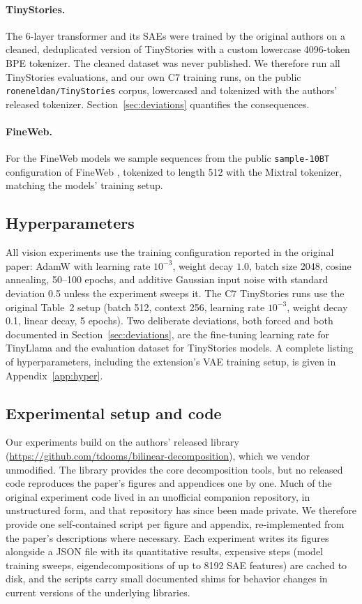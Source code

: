 \documentclass[10pt]{article} %
\begin{document}
\paragraph{TinyStories.} The 6-layer transformer and its SAEs were trained by the
original authors on a cleaned, deduplicated version of TinyStories
\citep{eldan2023tinystories} with a custom lowercase 4096-token BPE tokenizer.
The cleaned dataset was never published. We therefore run all
TinyStories evaluations, and our own C7 training runs, on the public
\texttt{roneneldan/TinyStories} corpus, lowercased and tokenized with the authors'
released tokenizer. Section~\ref{sec:deviations} quantifies the consequences.

\paragraph{FineWeb.} For the FineWeb models we sample sequences from the public
\texttt{sample-10BT} configuration of FineWeb \citep{penedo2024fineweb}, tokenized to
length 512 with the Mixtral tokenizer, matching the models' training setup.

\subsection{Hyperparameters}
\label{sec:hyper}

All vision experiments use the training configuration reported in the original paper:
AdamW with learning rate $10^{-3}$, weight decay $1.0$, batch size 2048, cosine
annealing, 50--100 epochs, and additive Gaussian input noise with standard deviation
0.5 unless the experiment sweeps it. The C7 TinyStories runs use the original Table~2
setup (batch 512, context 256, learning rate $10^{-3}$, weight decay 0.1, linear
decay, 5 epochs). Two deliberate deviations, both forced and both documented in
Section~\ref{sec:deviations}, are the fine-tuning learning rate for TinyLlama and the
evaluation dataset for TinyStories models. A complete listing of hyperparameters,
including the extension's VAE training setup, is given in Appendix~\ref{app:hyper}.

\subsection{Experimental setup and code}
\label{sec:setup}

Our experiments build on the authors' released library
(\url{https://github.com/tdooms/bilinear-decomposition}), which we vendor unmodified.
The library provides the core decomposition tools, but no released code reproduces
the paper's figures and appendices one by one. Much of the original experiment code
lived in an unofficial companion repository, in unstructured form, and that
repository has since been made private. We therefore provide one self-contained
script per figure and appendix, re-implemented from the paper's descriptions where
necessary. Each experiment writes its figures alongside a JSON file with its
quantitative results, expensive steps (model training sweeps, eigendecompositions of
up to 8192 SAE features) are cached to disk, and the scripts carry small documented
shims for behavior changes in current versions of the underlying libraries.
\end{document}

